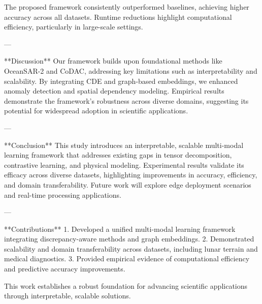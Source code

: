 The proposed framework consistently outperformed baselines, achieving higher accuracy across all datasets. Runtime reductions highlight computational efficiency, particularly in large-scale settings.

---

**Discussion**  
Our framework builds upon foundational methods like OceanSAR-2 and CoDAC, addressing key limitations such as interpretability and scalability. By integrating CDE and graph-based embeddings, we enhanced anomaly detection and spatial dependency modeling. Empirical results demonstrate the framework’s robustness across diverse domains, suggesting its potential for widespread adoption in scientific applications.

---

**Conclusion**  
This study introduces an interpretable, scalable multi-modal learning framework that addresses existing gaps in tensor decomposition, contrastive learning, and physical modeling. Experimental results validate its efficacy across diverse datasets, highlighting improvements in accuracy, efficiency, and domain transferability. Future work will explore edge deployment scenarios and real-time processing applications.

---

**Contributions**  
1. Developed a unified multi-modal learning framework integrating discrepancy-aware methods and graph embeddings.  
2. Demonstrated scalability and domain transferability across datasets, including lunar terrain and medical diagnostics.  
3. Provided empirical evidence of computational efficiency and predictive accuracy improvements.  

This work establishes a robust foundation for advancing scientific applications through interpretable, scalable solutions.